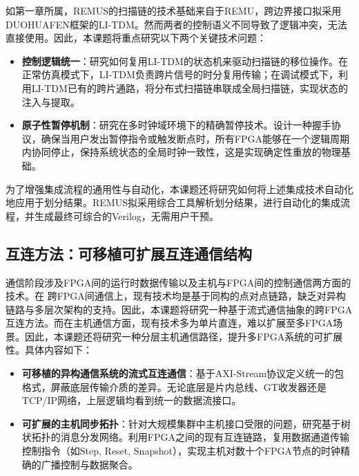 如第一章所属，REMUS的扫描链的技术基础来自于REMU，跨边界接口拟采用DUOHUAFEN框架的LI-TDM。然而两者的控制语义不同导致了逻辑冲突，无法直接使用。因此，本课题将重点研究以下两个关键技术问题：

\begin{itemize}

    \item \textbf{控制逻辑统一}：研究如何复用LI-TDM的状态机来驱动扫描链的移位操作。在正常仿真模式下，LI-TDM负责跨片信号的时分复用传输；在调试模式下，利用LI-TDM已有的跨片通路，将分布式扫描链串联成全局扫描链，实现状态的注入与提取。
    
    \item \textbf{原子性暂停机制}：研究在多时钟域环境下的精确暂停技术。设计一种握手协议，确保当用户发出暂停指令或触发断点时，所有FPGA能够在一个逻辑周期内协同停止，保持系统状态的全局时钟一致性，这是实现确定性重放的物理基础。
    
\end{itemize}

为了增强集成流程的通用性与自动化，本课题还将研究如何将上述集成技术自动化地应用于划分结果。REMUS拟采用综合工具解析划分结果，进行自动化的集成流程，并生成最终可综合的Verilog，无需用户干预。

\subsection{互连方法：可移植可扩展互连通信结构}

通信阶段涉及FPGA间的运行时数据传输以及主机与FPGA间的控制通信两方面的技术。在 跨FPGA间通信上，现有技术均是基于同构的点对点链路，缺乏对异构链路与多层次架构的支持。因此，本课题将研究一种基于流式通信抽象的跨FPGA互连方法。而在主机通信方面，现有技术多为单片直连，难以扩展至多FPGA场景。因此，本课题还将研究一种分层主机通信路径，提升多FPGA系统的可扩展性。具体内容如下：

\begin{itemize}
    \item \textbf{可移植的异构通信系统的流式互连通信}：基于AXI-Stream协议定义统一的包格式，屏蔽底层传输介质的差异。无论底层是片内总线、GT收发器还是TCP/IP网络，上层逻辑均看到统一的数据流接口。
          
    \item \textbf{可扩展的主机同步拓扑}：针对大规模集群中主机接口受限的问题，研究基于树状拓扑的消息分发网络。利用FPGA之间的现有互连链路，复用数据通道传输控制指令（如Step, Reset, Snapshot），实现主机对数十个FPGA节点的时钟精确的广播控制与数据聚合。
\end{itemize}

